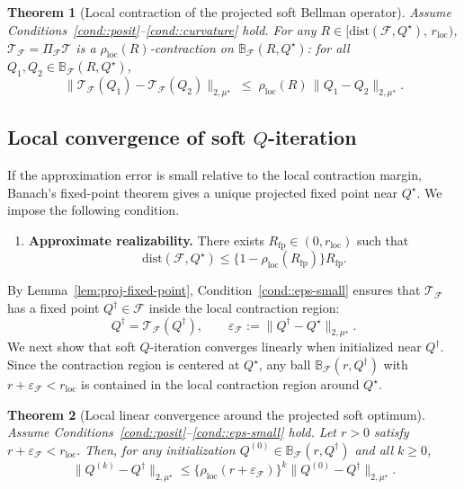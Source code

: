 \documentclass{article}
\theoremstyle{plain}
\newtheorem{theorem}{Theorem}
\theoremstyle{definition}
\theoremstyle{remark}
\begin{document}
\begin{theorem}[Local contraction of the projected soft Bellman operator]
\label{thm:local-contraction}
Assume Conditions~\ref{cond::posit}--\ref{cond::curvature} hold. For any
\(R \in [\mathrm{dist}(\mathcal F,Q^\star),\, r_{\mathrm{loc}})\),
\(\mathcal{T}_{\mathcal F} = \Pi_{\mathcal F} \mathcal T\)
is a \(\rho_{\mathrm{loc}}(R)\)-contraction on
\(\mathbb{B}_{\mathcal{F}}(R,Q^\star)\): for all
\(Q_1,Q_2 \in \mathbb{B}_{\mathcal{F}}(R,Q^\star)\),
\[
\|\mathcal{T}_{\mathcal F}(Q_1)
- \mathcal{T}_{\mathcal F}(Q_2)\|_{2,\mu^\star}
\;\le\;
\rho_{\mathrm{loc}}(R)\,\|Q_1 - Q_2\|_{2,\mu^\star}.
\]
\end{theorem}
 

\subsection{Local convergence of soft \(Q\)-iteration}

If the approximation error is small relative to the local contraction margin,
Banach's fixed-point theorem gives a unique projected fixed point near
\(Q^\star\). We impose the following condition.

\begin{enumerate}[label=\textbf{C\arabic*)}, ref={C\arabic*}, leftmargin=1.5em, resume=cond]
\item \label{cond::eps-small}
\textbf{Approximate realizability.}
There exists \(R_{\mathrm{fp}}\in(0,r_{\mathrm{loc}})\) such that
\[
\mathrm{dist}(\mathcal F,Q^\star)
\le
\{1-\rho_{\mathrm{loc}}(R_{\mathrm{fp}})\}R_{\mathrm{fp}}.
\]
\end{enumerate}

By Lemma~\ref{lem:proj-fixed-point}, Condition~\ref{cond::eps-small} ensures
that \(\mathcal T_{\mathcal F}\) has a fixed point \(Q^\dagger\in\mathcal F\)
inside the local contraction region:
\[
Q^\dagger=\mathcal T_{\mathcal F}(Q^\dagger),
\qquad
\varepsilon_{\mathcal F}
:=
\|Q^\dagger-Q^\star\|_{2,\mu^\star}.
\]
We next show that soft \(Q\)-iteration converges linearly when initialized near
\(Q^\dagger\). Since the contraction region is centered at \(Q^\star\), any ball
\(\mathbb B_{\mathcal F}(r,Q^\dagger)\) with
\(r+\varepsilon_{\mathcal F}<r_{\mathrm{loc}}\) is contained in the local
contraction region around \(Q^\star\).

\begin{theorem}[Local linear convergence around the projected soft optimum]
\label{thm:local-linear}
Assume Conditions~\ref{cond::posit}--\ref{cond::eps-small} hold. Let
\(r>0\) satisfy $r+\varepsilon_{\mathcal F}<r_{\mathrm{loc}}.$ 
Then, for any initialization
\(Q^{(0)}\in\mathbb B_{\mathcal F}(r,Q^\dagger)\) and all \(k\ge0\),
\[
\|Q^{(k)} - Q^\dagger\|_{2,\mu^\star}
\le
\{\rho_{\mathrm{loc}}(r+\varepsilon_{\mathcal F})\}^k
\|Q^{(0)} - Q^\dagger\|_{2,\mu^\star}.
\]
\end{theorem}
\end{document}
